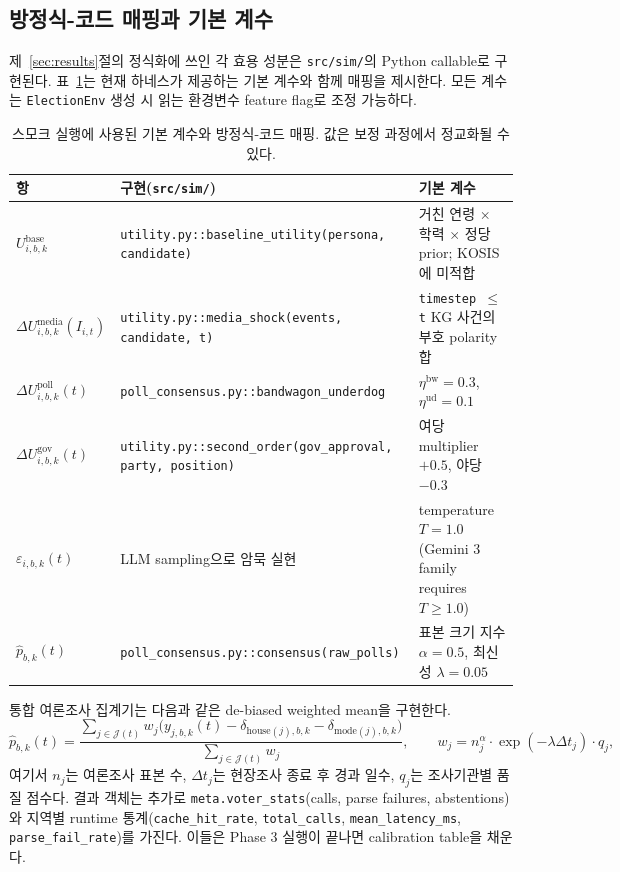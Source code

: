 \documentclass[11pt]{article}
\begin{document}
\subsection{방정식-코드 매핑과 기본 계수}
\label{app:eq-code}

제~\ref{sec:results}절의 정식화에 쓰인 각 효용 성분은 \texttt{src/sim/}의 Python callable로 구현된다. 표~\ref{tab:eq-code}는 현재 하네스가 제공하는 기본 계수와 함께 매핑을 제시한다. 모든 계수는 \texttt{ElectionEnv} 생성 시 읽는 환경변수 feature flag로 조정 가능하다.

\begin{table}[h]
\centering
\caption{스모크 실행에 사용된 기본 계수와 방정식-코드 매핑. 값은 보정 과정에서 정교화될 수 있다.}
\label{tab:eq-code}
\small
\begin{tabular}{p{}p{}p{}}
\toprule
항 & 구현(\texttt{src/sim/}) & 기본 계수 \\
\midrule
$U^{\text{base}}_{i,b,k}$ & \texttt{utility.py::baseline\_utility(persona, candidate)} & 거친 연령 $\times$ 학력 $\times$ 정당 prior; KOSIS에 미적합 \\
$\Delta U^{\text{media}}_{i,b,k}(I_{i,t})$ & \texttt{utility.py::media\_shock(events, candidate, t)} & \texttt{timestep $\le$ t} KG 사건의 부호 polarity 합 \\
$\Delta U^{\text{poll}}_{i,b,k}(t)$ & \texttt{poll\_consensus.py::bandwagon\_underdog} & $\eta^{\text{bw}}=0.3$, $\eta^{\text{ud}}=0.1$ \\
$\Delta U^{\text{gov}}_{i,b,k}(t)$ & \texttt{utility.py::second\_order(gov\_approval, party, position)} & 여당 multiplier $+0.5$, 야당 $-0.3$ \\
$\varepsilon_{i,b,k}(t)$ & LLM sampling으로 암묵 실현 & temperature $T = 1.0$(Gemini 3 family requires $T \ge 1.0$) \\
$\hat p_{b,k}(t)$ & \texttt{poll\_consensus.py::consensus(raw\_polls)} & 표본 크기 지수 $\alpha = 0.5$, 최신성 $\lambda = 0.05$ \\
\bottomrule
\end{tabular}
\end{table}

통합 여론조사 집계기는 다음과 같은 de-biased weighted mean을 구현한다.
\begin{equation}
\hat p_{b,k}(t) = \frac{\sum_{j \in \mathcal{J}(t)} w_j \big(y_{j,b,k}(t) - \delta_{\text{house}(j),b,k} - \delta_{\text{mode}(j),b,k}\big)}{\sum_{j \in \mathcal{J}(t)} w_j}, \qquad w_j = n_j^{\alpha} \cdot \exp(-\lambda \Delta t_j) \cdot q_j,
\end{equation}
여기서 $n_j$는 여론조사 표본 수, $\Delta t_j$는 현장조사 종료 후 경과 일수, $q_j$는 조사기관별 품질 점수다. 결과 객체는 추가로 \texttt{meta.voter\_stats}(calls, parse failures, abstentions)와 지역별 runtime 통계(\texttt{cache\_hit\_rate}, \texttt{total\_calls}, \texttt{mean\_latency\_ms}, \texttt{parse\_fail\_rate})를 가진다. 이들은 Phase 3 실행이 끝나면 calibration table을 채운다.
\end{document}
